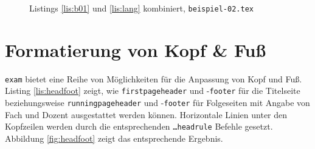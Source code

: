 \begin{figure}[b]
\caption{Listings \ref{lis:b01} und \ref{lis:lang} kombiniert, \texttt{beispiel-02.tex}}\label{fig:b02}
\end{figure}

\section{Formatierung von Kopf \& Fuß}

\texttt{exam} bietet eine Reihe von Möglichkeiten für die Anpassung von Kopf und Fuß. Listing \ref{lis:headfoot} zeigt, wie \texttt{firstpageheader} und -\texttt{footer} für die Titelseite beziehungsweise \texttt{runningpageheader} und -\texttt{footer} für Folgeseiten mit Angabe von Fach und Dozent ausgestattet werden können. Horizontale Linien unter den Kopfzeilen werden durch die entsprechenden \texttt{\dots headrule} Befehle gesetzt. Abbildung \ref{fig:headfoot} zeigt das entsprechende Ergebnis.


